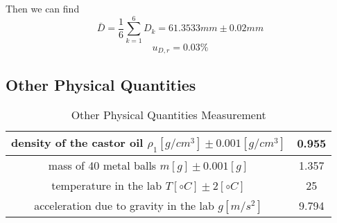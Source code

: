 Then we can find
$$  \bar{D} = \frac{1}{6} \sum_{k=1}^{6} D_k =  61.3533 mm \pm  0.02 mm   $$
$$  u_{D,r} =   0.03\%  $$ 


\subsection{Other Physical Quantities}

\begin{table}[H]
  \centering
  \begin{tabular}{|c|c|}
    \hline
    density of the castor oil $ \rho_1 [g/cm^3] \pm 0.001 [g/cm^3] $ & 0.955  \\ \hline 
    mass of 40 metal balls $ m  [g] \pm 0.001 [g] $ & 1.357 \\ \hline
    temperature in the lab $ T  [\circ C] \pm 2 [\circ C] $ & 25 \\ \hline
    acceleration due to gravity in the lab $ g [m/s^2] $ & 9.794 \\ \hline
  \end{tabular}
  \caption{Other Physical Quantities Measurement}
\end{table}
